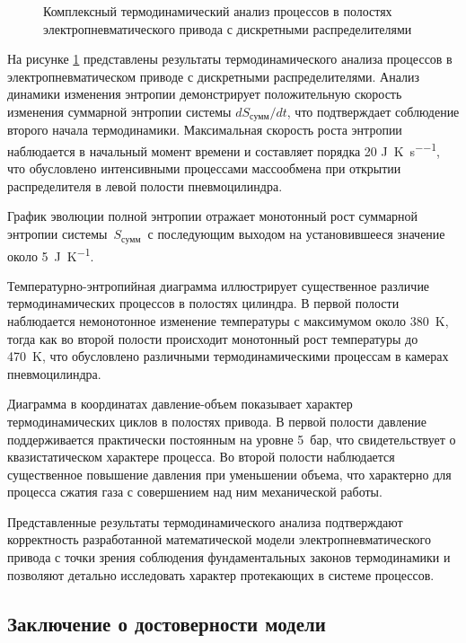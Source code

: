\begin{figure}[ht]
    \caption{Комплексный термодинамический анализ процессов в полостях электропневматического привода с дискретными распределителями}
    \label{fig:ch2/thermodynamics_analysis}

\end{figure}

На рисунке \ref{fig:ch2/thermodynamics_analysis} представлены результаты термодинамического анализа процессов в электропневматическом
приводе с дискретными распределителями. Анализ динамики изменения энтропии демонстрирует положительную скорость изменения суммарной 
энтропии системы $dS_{сумм}/dt$, что подтверждает соблюдение второго начала термодинамики.
Максимальная скорость роста энтропии наблюдается в начальный момент времени и составляет порядка 
20 \si{\joule\per\kelvin\per\second}, что обусловлено интенсивными процессами массообмена при открытии распределителя
в левой полости пневмоцилиндра.

График эволюции полной энтропии отражает монотонный рост суммарной энтропии системы~$S_{сумм}$~с последующим 
выходом на установившееся значение около 5~\si{\joule\per\kelvin}. 

Температурно-энтропийная диаграмма иллюстрирует существенное различие термодинамических процессов в полостях цилиндра.
В первой полости наблюдается немонотонное изменение температуры с максимумом около 380~\si{\kelvin},
тогда как во второй полости происходит монотонный рост температуры до 470~\si{\kelvin}, что обусловлено
различными термодинамическими процессам в камерах пневмоцилиндра.

Диаграмма в координатах давление-объем показывает характер термодинамических циклов в полостях привода. 
В первой полости давление поддерживается практически постоянным на уровне 5~бар, что свидетельствует о квазистатическом характере процесса.
Во второй полости наблюдается существенное повышение давления при уменьшении объема, что характерно для процесса сжатия газа с совершением над ним
механической работы.

Представленные результаты термодинамического анализа подтверждают корректность
разработанной математической модели электропневматического привода с точки зрения соблюдения 
фундаментальных законов термодинамики и позволяют детально исследовать характер протекающих в системе процессов.

\subsection{Заключение о достоверности модели}\label{sec:ch2/sec7/subsec5}

